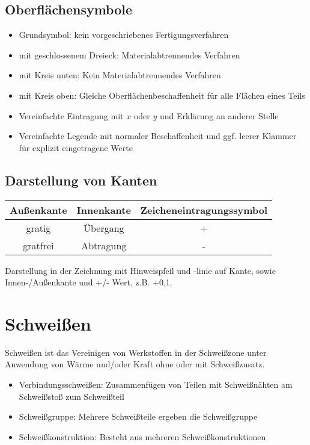 \documentclass[a4paper,parskip=half*,DIV=7,fontsize=11pt]{scrartcl}
\begin{document}
\subsection{Oberflächensymbole}
\begin{itemize}
	\item Grundsymbol: kein vorgeschriebenes Fertigungsverfahren
	\item mit geschlossenem Dreieck: Materialabtrennendes Verfahren
	\item mit Kreis unten: Kein Materialabtrennendes Verfahren
	\item mit Kreis oben: Gleiche Oberflächenbeschaffenheit für alle Flächen eines Teils
	\item Vereinfachte Eintragung mit $x$ oder $y$ und Erklärung an anderer Stelle
	\item Vereinfachte Legende mit normaler Beschaffenheit und ggf. leerer Klammer für explizit eingetragene Werte
\end{itemize}
	
\subsection{Darstellung von Kanten}
\begin{tabular}{|c|c|c|}
	\hline
	Außenkante & Innenkante & Zeicheneintragungssymbol \\
	\hline
	gratig      & Übergang  & +                        \\
	\hline
	gratfrei    & Abtragung  & -                        \\
	\hline 
\end{tabular}

Darstellung in der Zeichnung mit Hinweispfeil und -linie auf Kante, sowie Innen-/Außenkante und +/- Wert, z.B. +0,1.
	
\section{Schweißen}
Schweißen ist das Vereinigen von Werkstoffen in der Schweißzone unter
Anwendung von Wärme und/oder Kraft ohne oder mit Schweißzusatz.
\begin{itemize}
	\item Verbindungsschweißen: Zusammenfügen von Teilen mit Schweißnähten am Schweißstoß zum Schweißteil
	\item Schweißgruppe: Mehrere Schweißteile ergeben die Schweißgruppe
	\item Schweißkonstruktion: Besteht aus mehreren Schweißkonstruktionen
\end{itemize}
\end{document}
